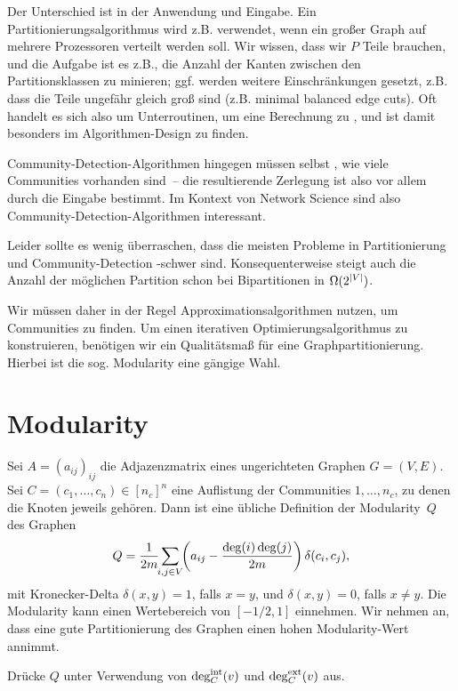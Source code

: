 Der Unterschied ist in der Anwendung und Eingabe.
Ein Partitionierungsalgorithmus wird z.B. verwendet, wenn ein großer Graph auf mehrere Prozessoren verteilt werden soll.
Wir wissen, dass wir $P$ Teile brauchen, und die Aufgabe ist es z.B., die Anzahl der Kanten zwischen den Partitionsklassen zu minieren;
ggf. werden weitere Einschränkungen gesetzt, z.B. dass die Teile ungefähr gleich groß sind (z.B. minimal balanced edge cuts).
Oft handelt es sich also um Unterroutinen, um eine Berechnung zu , und ist damit besonders im Algorithmen-Design zu finden.

Community-Detection-Algorithmen hingegen müssen selbst , wie viele Communities vorhanden sind~--
die resultierende Zerlegung ist also vor allem durch die Eingabe bestimmt.
Im Kontext von Network Science sind also Community-Detection-Algorithmen interessant.

Leider sollte es wenig überraschen, dass die meisten Probleme in Partitionierung und Community-Detection \NP-schwer sind.
Konsequenterweise steigt auch die Anzahl der möglichen Partition schon bei Bipartitionen in $\Omega(2^{\lvert V\rvert})$.

Wir müssen daher in der Regel Approximationsalgorithmen nutzen, um Communities zu finden.
Um einen iterativen Optimierungsalgorithmus zu konstruieren, benötigen wir ein Qualitätsmaß für eine Graphpartitionierung.
Hierbei ist die sog. Modularity eine gängige Wahl.

\section{Modularity}
Sei $A = (a_{ij})_{ij}$ die Adjazenzmatrix eines ungerichteten Graphen $G = (V, E)$.
Sei $C = (c_1, \ldots, c_n) \in [n_c]^n$ eine Auflistung der Communities $1, \ldots, n_c$, zu denen die Knoten jeweils gehören.
Dann ist eine übliche Definition der Modularity~$Q$ des Graphen
\begin{equation}
    Q = \frac{1}{2m} \smashoperator{\sum_{i,j \in V}} \left( a_{ij} - \frac{\deg(i)\deg(j)}{2m} \right) \delta(c_i, c_j),
\end{equation}
mit Kronecker-Delta $\delta(x,y) = 1$, falls $x=y$, und $\delta(x,y) = 0$, falls $x \ne y$.
Die Modularity kann einen Wertebereich von $[-1/2, 1]$ einnehmen.
Wir nehmen an, dass eine gute Partitionierung des Graphen einen hohen Modularity-Wert annimmt.

\begin{exercise}
    Drücke $Q$ unter Verwendung von $\deg^{\text{int}}_C(v)$ und $\deg^{\text{ext}}_C(v)$ aus.
\end{exercise}

